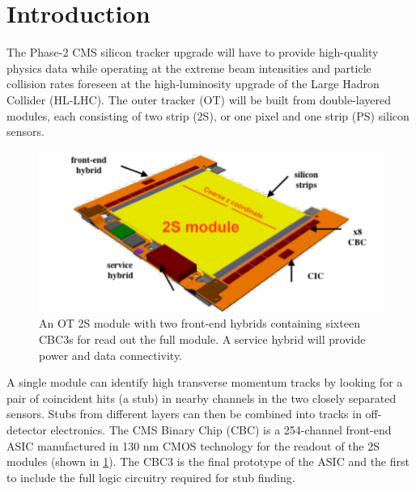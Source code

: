 \section{Introduction}
The Phase-2 CMS silicon tracker upgrade \cite{CMSouterTrackerPh2TDR} will have to provide high-quality physics data while operating at the extreme beam intensities and particle collision rates foreseen at the high-luminosity upgrade of the Large Hadron Collider (HL-LHC). The outer tracker (OT) will be built from double-layered modules, each consisting of two strip (2S), or one pixel and one strip (PS) silicon sensors.
\begin{figure}[!htbp]
\centering
\includegraphics[width=0.75\linewidth]{Figures/Drawing_2Smodule.pdf}
\vspace*{-2mm}
\caption[2S module.]{An OT 2S module with two front-end hybrids containing sixteen CBC3s for read out the full module. A service hybrid will provide power and data connectivity.} 
\label{fig:Schematic2Smodule}
\end{figure} 

A single module can identify high transverse momentum tracks by looking for a pair of coincident hits (a stub) in nearby channels in the two closely separated sensors. Stubs from different layers can then be combined into tracks in off-detector electronics. The CMS Binary Chip (CBC) is a 254-channel front-end ASIC manufactured in 130 nm CMOS technology for the readout of the 2S modules (shown in \cref{fig:Schematic2Smodule}). The CBC3 \cite{CBC3} is the final prototype of the ASIC and the first to include the full logic circuitry required for stub finding.




